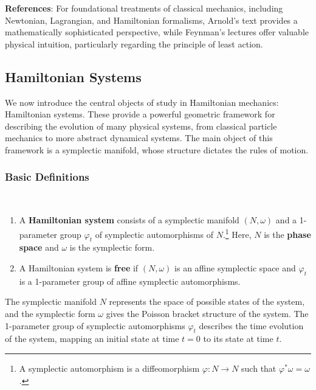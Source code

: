 
\setcounter{tocdepth}{3}
\localtableofcontents

\textbf{References}: For foundational treatments of classical mechanics, including Newtonian, Lagrangian, and Hamiltonian formalisms, Arnold's text \cite{Arnold1989Mechanics} provides a mathematically sophisticated perspective, while Feynman's lectures \cite{FeynmanLeastAction} offer valuable physical intuition, particularly regarding the principle of least action. 

\newpage

\subsection{Hamiltonian Systems}
\label{sec:hamiltonian_systems}

We now introduce the central objects of study in Hamiltonian mechanics: Hamiltonian systems. These provide a powerful geometric framework for describing the evolution of many physical systems, from classical particle mechanics to more abstract dynamical systems. The main object of this framework is a symplectic manifold, whose structure dictates the rules of motion.

\subsubsection{Basic Definitions}
\label{subsec:hamiltonian_def_structure}

\begin{definition}
\,
\begin{enumerate}
    \item A \textbf{Hamiltonian system} consists of a symplectic manifold $(N, \omega)$ and a 1-parameter group $\varphi_{t}$ of symplectic automorphisms of $N$.\footnote{A symplectic automorphism is a diffeomorphism $\varphi: N \rightarrow N$ such that $\varphi^*\omega = \omega$.} Here, $N$ is the \textbf{phase space} and $\omega$ is the symplectic form.
    \item A Hamiltonian system is \textbf{free} if $(N,\omega)$ is an affine symplectic space and $\varphi_{t}$ is a 1-parameter group of affine symplectic automorphisms.
\end{enumerate}
\end{definition}

The symplectic manifold $N$ represents the space of possible states of the system, and the symplectic form $\omega$ gives the Poisson bracket structure of the system. The 1-parameter group of symplectic automorphisms $\varphi_{t}$ describes the time evolution of the system, mapping an initial state at time $t=0$ to its state at time $t$.

